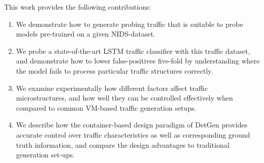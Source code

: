 \documentclass[runningheads]{llncs}
\begin{document}

 
This work provides the following contributions:

\begin{enumerate}
\item We demonstrate how to generate probing traffic that is suitable to probe models pre-trained on a given
NIDS-dataset.

\item We probe a state-of-the-art LSTM traffic classifier with this traffic dataset, and demonstrate how to lower false-positives five-fold by understanding where the model fails to process particular traffic structures correctly.

\item We examine experimentally how different factors affect traffic microstructures, and how well they can be controlled effectively when compared to common VM-based traffic generation setups.

\item We describe how the container-based design paradigm of DetGen provides accurate control over traffic characteristics as well as corresponding ground truth information, and compare the design advantages to traditional generation set-ups.





\end{enumerate}
\end{document}
